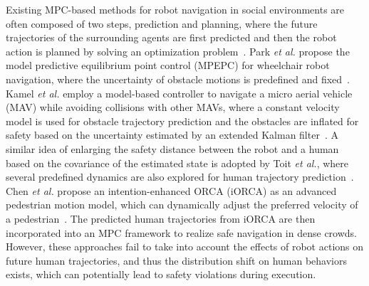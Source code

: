 Existing MPC-based methods for robot navigation in social environments are often composed of two steps, prediction and planning, where the future trajectories of the surrounding agents are first predicted and then the robot action is planned by solving an optimization problem~\cite{chen2021interactive}. Park \textit{et al.} propose the model predictive equilibrium point control (MPEPC) for wheelchair robot navigation, where the uncertainty of obstacle motions is predefined and fixed~\cite{park2012robot}. Kamel \textit{et al.} employ a model-based controller to navigate a micro aerial vehicle (MAV) while avoiding collisions with other MAVs, where a constant velocity model is used for obstacle trajectory prediction and the obstacles are inflated for safety based on the uncertainty estimated by an extended Kalman filter~\cite{kamel2017robust}. A similar idea of enlarging the safety distance between the robot and a human based on the covariance of the estimated state is adopted by Toit \textit{et al.}, where several predefined dynamics are also explored for human trajectory prediction~\cite{du2011robot}. Chen \textit{et al.} propose an intention-enhanced ORCA (iORCA) as an advanced pedestrian motion model, which can dynamically adjust the preferred velocity of a pedestrian~\cite{chen2021interactive}. The predicted human trajectories from iORCA are then incorporated into an MPC framework to realize safe navigation in dense crowds. However, these approaches fail to take into account the effects of robot actions on future human trajectories, and thus the distribution shift on human behaviors exists, which can potentially lead to safety violations during execution.